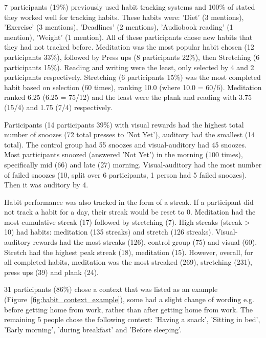 7 participants (19\%) previously used habit tracking systems and 100\% of stated they worked well for tracking habits. These habits were: 'Diet' (3 mentions), 'Exercise' (3 mentions), 'Deadlines' (2 mentions), 'Audiobook reading' (1 mention), 'Weight' (1 mention). All of these participants chose new habits that they had not tracked before. Meditation was the most popular habit chosen (12 participants 33\%), followed by Press ups (8 participants 22\%), then Stretching (6 participants 15\%). Reading and writing were the least, only selected by 4 and 2 participants respectively. Stretching (6 participants 15\%) was the most completed habit based on selection (60 times), ranking 10.0 (where 10.0 = 60/6). Meditation ranked 6.25 (6.25 = 75/12) and the least were the plank and reading with 3.75 (15/4) and 1.75 (7/4) respectively.

Participants (14 participants 39\%) with visual rewards had the highest total number of snoozes (72 total presses to 'Not Yet'), auditory had the smallest (14 total). The control group had 55 snoozes and visual-auditory had 45 snoozes. Most participants snoozed (answered 'Not Yet') in the morning (100 times), specifically mid (66) and late (27) morning. Visual-auditory had the most number of failed snoozes (10, split over 6 participants, 1 person had 5 failed snoozes). Then it was auditory by 4.

Habit performance was also tracked in the form of a streak. If a participant did not track a habit for a day, their streak would be reset to 0. Meditation had the most cumulative streak (17) followed by stretching (7). High streaks (streak > 10) had habits: meditation (135 streaks) and stretch (126 streaks). Visual-auditory rewards had the most streaks (126), control group (75) and visual (60). Stretch had the highest peak streak (18), meditation (15). However, overall, for all completed habits, meditation was the most streaked (269), stretching (231), press ups (39) and plank (24).

31 participants (86\%) chose a context that was listed as an example (Figure~\ref{fig:habit_context_example}), some had a slight change of wording e.g. before getting home from work, rather than after getting home from work. The remaining 5 people chose the following context: 'Having a snack', 'Sitting in bed', 'Early morning', 'during breakfast' and 'Before sleeping'.

